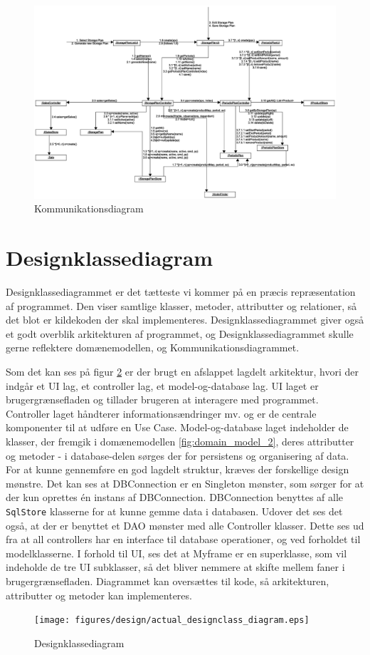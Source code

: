 \begin{landscape}
    \begin{figure}[p]
        \centering
        \includegraphics[width=0.8\hsize]{figures/design/Kommunikationsdiagram.eps}
        \caption{Kommunikationsdiagram}
        \label{fig:Kommunikationsdiagram}
    \end{figure}
\end{landscape}

\section{Designklassediagram}
Designklassediagrammet er det tætteste vi kommer på en præcis repræsentation af programmet. Den viser samtlige klasser, metoder, attributter og relationer, så det blot er kildekoden der skal implementeres. Designklassediagrammet giver også et godt overblik arkitekturen af programmet, og Designklassediagrammet skulle gerne reflektere domænemodellen, og Kommunikationsdiagrammet.

Som det kan ses på figur \ref{fig:designclassdiagram} er der brugt en afslappet lagdelt arkitektur, hvori der indgår et UI lag, et controller lag, et model-og-database lag\cite{Larman2004}. UI laget er brugergrænsefladen og tillader brugeren at interagere med programmet. Controller laget håndterer informationsændringer mv. og er de centrale komponenter til at udføre en Use Case. Model-og-database laget indeholder de klasser, der fremgik i domænemodellen \ref{fig:domain_model_2}, deres attributter og metoder - i database-delen sørges der for persistens og organisering af data. 
For at kunne gennemføre en god lagdelt struktur, kræves der forskellige design mønstre. Det kan ses at DBConnection er en Singleton mønster\cite{Larman2004}, som sørger for at der kun oprettes én instans af DBConnection. DBConnection benyttes af alle \verb|SqlStore| klasserne for at kunne gemme data i databasen. Udover det ses det også, at der er benyttet et DAO mønster\cite{DAO} med alle Controller klasser. Dette ses ud fra at all controllers har en interface til database operationer, og ved forholdet til modelklasserne.
I forhold til UI, ses det at Myframe er en superklasse, som vil indeholde de tre UI subklasser, så det bliver nemmere at skifte mellem faner i brugergrænsefladen.
Diagrammet kan oversættes til kode, så arkitekturen, attributter og metoder kan implementeres.

\begin{landscape}
    \begin{figure}
        \centering
        \texttt{[image: figures/design/actual\_designclass\_diagram.eps]}
        \caption{Designklassediagram}
        \label{fig:designclassdiagram}
    \end{figure}
\end{landscape}

